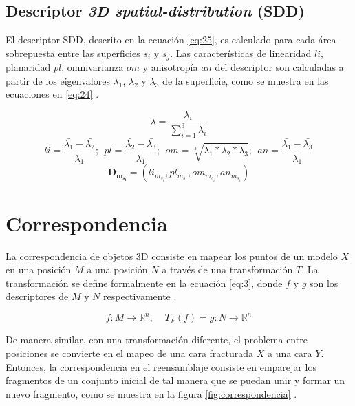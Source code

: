 \subsection{Descriptor \textit{3D spatial-distribution} (SDD)}
El descriptor SDD, descrito en la ecuación \ref{eq:25}, es calculado para cada área sobrepuesta entre las superficies $s_i$ y $s_j$.  Las características de linearidad $li$, planaridad $pl$, omnivarianza $om$ y anisotropía $an$ del descriptor son calculadas a partir de los eigenvalores $\lambda_1$, $\lambda_2$ y $\lambda_3$ de la superficie, como se muestra en las ecuaciones en \ref{eq:24} \cite{7}.

\begin{equation} \label{eq:23}
    \bar{\lambda} = \frac{\lambda_i}{\sum_{i=1}^{3} \lambda_i}
\end{equation}
\begin{equation} \label{eq:24}
    li = \frac{\bar{\lambda_1}-\bar{\lambda_2}}{\bar{\lambda_1}};
    \ \ pl = \frac{\bar{\lambda_2}-\bar{\lambda_3}}{\bar{\lambda_1}};
    \ \ om = \sqrt[3]{\bar{\lambda_1}*\bar{\lambda_2}*\bar{\lambda_3}};
    \ \ an = \frac{\bar{\lambda_1}-\bar{\lambda_3}}{\bar{\lambda_1}}
\end{equation}
\begin{equation} \label{eq:25}
    \mathbf{D_{m_{s_i}}} = (li_{m_{s_i}}, pl_{m_{s_i}}, om_{m_{s_i}}, an_{m_{s_i}})
\end{equation}


\section{Correspondencia}

La correspondencia de objetos 3D consiste en mapear los puntos de un modelo $X$ en una posición $M$ a una posición $N$ a través de una transformación $T$. La transformación se define formalmente en la ecuación \ref{eq:3}, donde $f$ y $g$ son los descriptores de $M$ y $N$ respectivamente \cite{17}.

\begin{equation} \label{eq:3}
    f:M \xrightarrow{} \mathbb{R}^n; \ \ \ \ \ T_F (f) = g:N \xrightarrow{} \mathbb{R}^n
\end{equation}

De manera similar, con una transformación diferente, el problema entre posiciones se convierte en el mapeo de una cara fracturada $X$ a una cara $Y$. Entonces, la correspondencia en el reensamblaje consiste en emparejar los fragmentos de un conjunto inicial de tal manera que se puedan unir y formar un nuevo fragmento, como se muestra en la figura \ref{fig:correspondencia} \cite{2}. 

